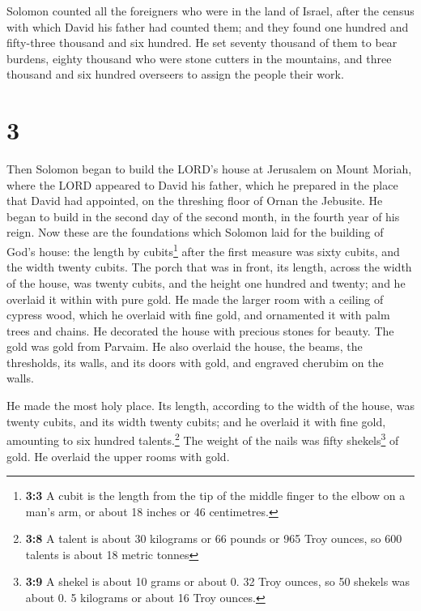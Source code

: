  Solomon counted all the foreigners who were in the land
of Israel, after the census with which David his father had counted
them; and they found one hundred and fifty-three thousand and six
hundred.  He set seventy thousand of them to bear
burdens, eighty thousand who were stone cutters in the mountains, and
three thousand and six hundred overseers to assign the people their
work.

\hypertarget{section-2}{%
\section{3}\label{section-2}}

 Then Solomon began to build the LORD's house at Jerusalem
on Mount Moriah, where the LORD appeared to David his father, which he
prepared in the place that David had appointed, on the threshing floor
of Ornan the Jebusite.  He began to build in the second
day of the second month, in the fourth year of his reign. 
Now these are the foundations which Solomon laid for the building of
God's house: the length by cubits\footnote{\textbf{3:3} A cubit is the
  length from the tip of the middle finger to the elbow on a man's arm,
  or about 18 inches or 46 centimetres.} after the first measure was
sixty cubits, and the width twenty cubits.  The porch that
was in front, its length, across the width of the house, was twenty
cubits, and the height one hundred and twenty; and he overlaid it within
with pure gold.  He made the larger room with a ceiling of
cypress wood, which he overlaid with fine gold, and ornamented it with
palm trees and chains.  He decorated the house with
precious stones for beauty. The gold was gold from Parvaim.
 He also overlaid the house, the beams, the thresholds,
its walls, and its doors with gold, and engraved cherubim on the walls.

 He made the most holy place. Its length, according to the
width of the house, was twenty cubits, and its width twenty cubits; and
he overlaid it with fine gold, amounting to six hundred
talents.\footnote{\textbf{3:8} A talent is about 30 kilograms or 66
  pounds or 965 Troy ounces, so 600 talents is about 18 metric tonnes}
 The weight of the nails was fifty shekels\footnote{\textbf{3:9}
  A shekel is about 10 grams or about 0. 32 Troy ounces, so 50 shekels
  was about 0. 5 kilograms or about 16 Troy ounces.} of gold. He
overlaid the upper rooms with gold.

